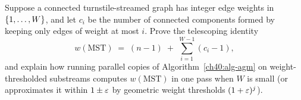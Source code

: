 \begin{exercise}
Suppose a connected turnstile-streamed graph has integer edge weights in
$\{1,\dots,W\}$, and let $c_i$ be the number of connected components formed
by keeping only edges of weight at most $i$. Prove the telescoping identity
\[
  w(\mathrm{MST}) \;=\; (n - 1) \;+\; \sum_{i=1}^{W-1} (c_i - 1),
\]
and explain how running parallel copies of Algorithm~\ref{ch40:alg-agm} on
weight-thresholded substreams computes $w(\mathrm{MST})$ in one pass when $W$
is small (or approximates it within $1\pm\varepsilon$ by geometric weight thresholds
$(1+\varepsilon)^j$).
\end{exercise}
